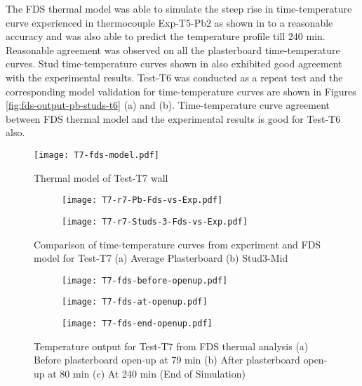 The FDS thermal model was able to simulate the steep rise in time-temperature curve experienced in thermocouple Exp-T5-Pb2 as shown in  to a reasonable accuracy and was also able to predict the temperature profile till 240 min. Reasonable agreement was observed on all the plasterboard time-temperature curves. Stud time-temperature curves shown in  also exhibited good agreement with the experimental results. Test-T6 was conducted as a repeat test and the corresponding model validation for time-temperature curves are shown in Figures \ref{fig:fds-output-pb-studs-t6} (a) and (b). Time-temperature curve agreement between FDS thermal model and the experimental results is good for Test-T6 also.
\begin{figure}[!htbp]
	\centering
		\texttt{[image: T7-fds-model.pdf]}
		\caption{Thermal model of Test-T7 wall}
		\label{fig:T7-fds-model-cavity}
\end{figure}
\begin{figure}[!htbp]
	\centering
	\begin{subfigure}[b]{0.7\textwidth}
		\centering
		\texttt{[image: T7-r7-Pb-Fds-vs-Exp.pdf]}
		\caption{}
		\label{subfig:T7-r7-Pb-Fds-vs-Exp}
	\end{subfigure}
	\begin{subfigure}[b]{0.6\textwidth}
		\centering
		\texttt{[image: T7-r7-Studs-3-Fds-vs-Exp.pdf]}
		\caption{}
		\label{subfig:T7-r7-Studs-3-Fds-vs-Exp}
	\end{subfigure}
	   \caption{Comparison of time-temperature curves from experiment and FDS model for Test-T7 (a) Average Plasterboard (b) Stud3-Mid}
	   \label{fig:fds-output-pb-studs-t7}
\end{figure}
\begin{figure}[!htbp]
	\centering
	\begin{subfigure}[b]{0.45\textwidth}
		\centering
		\texttt{[image: T7-fds-before-openup.pdf]}
		\caption{}
		\label{subfig:T7-fds-before-openup}
	\end{subfigure}
	\begin{subfigure}[b]{0.45\textwidth}
		\centering
		\texttt{[image: T7-fds-at-openup.pdf]}
		\caption{}
		\label{subfig:T7-fds-at-openup}
	\end{subfigure}
	\begin{subfigure}[b]{0.45\textwidth}
		\centering
		\texttt{[image: T7-fds-end-openup.pdf]}
		\caption{}
		\label{subfig:T7-fds-end-openup}
	\end{subfigure}
	   \caption{Temperature output for Test-T7 from FDS thermal analysis (a) Before plasterboard open-up at 79 min (b) After plasterboard open-up at 80 min (c) At 240 min (End of Simulation)}
	   \label{fig:T7-fds-output}
\end{figure}

